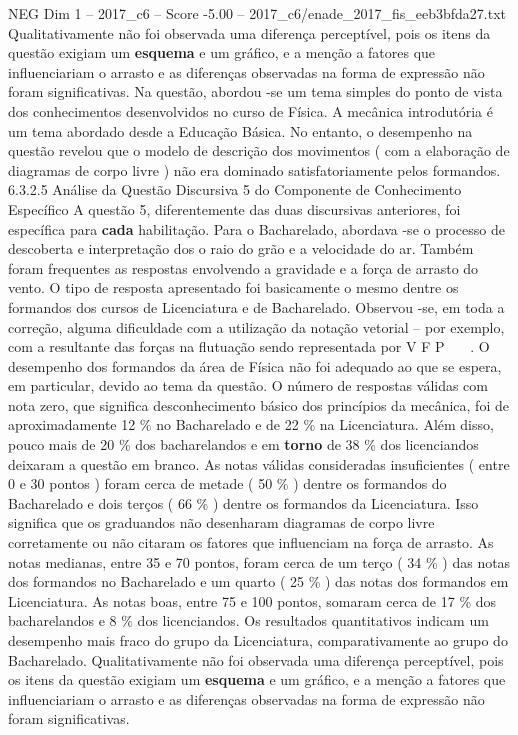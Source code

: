 \begin{textsample}{NEG Dim 1 – 2017\_c6 – Score -5.00 – 2017\_c6/enade\_2017\_fis\_eeb3bfda27.txt}
Qualitativamente não foi observada uma diferença perceptível, pois os itens da questão exigiam um \textbf{esquema} e um gráfico, e a menção a fatores que influenciariam o arrasto e as diferenças observadas na forma de expressão não foram significativas.
Na questão, abordou -se um tema simples do ponto de vista dos conhecimentos desenvolvidos no curso de Física.
A mecânica introdutória é um tema abordado desde a Educação Básica.
No entanto, o desempenho na questão revelou que o modelo de descrição dos movimentos ( com a elaboração de diagramas de corpo livre ) não era dominado satisfatoriamente pelos formandos. 6.3.2.5 Análise da Questão Discursiva 5 do Componente de Conhecimento Específico A questão 5, diferentemente das duas discursivas anteriores, foi específica para \textbf{cada} habilitação.
Para o Bacharelado, abordava -se o processo de descoberta e interpretação dos o raio do grão e a velocidade do ar.
Também foram frequentes as respostas envolvendo a gravidade e a força de arrasto do vento.
O tipo de resposta apresentado foi basicamente o mesmo dentre os formandos dos cursos de Licenciatura e de Bacharelado.
Observou -se, em toda a correção, alguma dificuldade com a utilização da notação vetorial – por exemplo, com a resultante das forças na flutuação sendo representada por V F P   .
O desempenho dos formandos da área de Física não foi adequado ao que se espera, em particular, devido ao tema da questão.
O número de respostas válidas com nota zero, que significa desconhecimento básico dos princípios da mecânica, foi de aproximadamente 12 \% no Bacharelado e de 22 \% na Licenciatura.
Além disso, pouco mais de 20 \% dos bacharelandos e em \textbf{torno} de 38 \% dos licenciandos deixaram a questão em branco.
As notas válidas consideradas insuficientes ( entre 0 e 30 pontos ) foram cerca de metade ( 50 \% ) dentre os formandos do Bacharelado e dois terços ( 66 \% ) dentre os formandos da Licenciatura.
Isso significa que os graduandos não desenharam diagramas de corpo livre corretamente ou não citaram os fatores que influenciam na força de arrasto.
As notas medianas, entre 35 e 70 pontos, foram cerca de um terço ( 34 \% ) das notas dos formandos no Bacharelado e um quarto ( 25 \% ) das notas dos formandos em Licenciatura.
As notas boas, entre 75 e 100 pontos, somaram cerca de 17 \% dos bacharelandos e 8 \% dos licenciandos.
Os resultados quantitativos indicam um desempenho mais fraco do grupo da Licenciatura, comparativamente ao grupo do Bacharelado.
Qualitativamente não foi observada uma diferença perceptível, pois os itens da questão exigiam um \textbf{esquema} e um gráfico, e a menção a fatores que influenciariam o arrasto e as diferenças observadas na forma de expressão não foram significativas.

\end{textsample}
